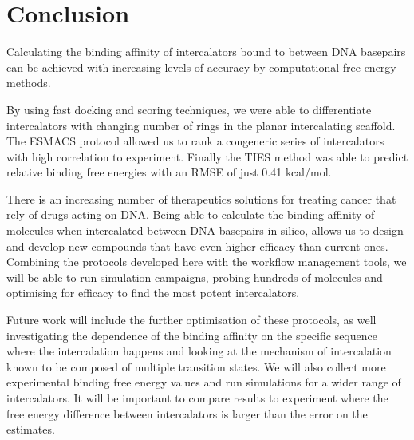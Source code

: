 \chapter{Conclusion}

Calculating the binding affinity of intercalators bound to between DNA basepairs can be achieved with increasing levels of accuracy by computational free energy methods. 

By using fast docking and scoring techniques, we were able to differentiate intercalators with changing number of rings in the planar intercalating scaffold. The ESMACS protocol allowed us to rank a congeneric series of intercalators with high correlation to experiment. Finally the TIES method was able to predict relative binding free energies with an RMSE of just 0.41 kcal/mol. 

There is an increasing number of therapeutics solutions for treating cancer that rely of drugs acting on DNA. Being able to calculate the binding affinity of molecules when intercalated between DNA basepairs in silico, allows us to design and develop new compounds that have even higher efficacy than current ones. Combining the protocols developed here with the workflow management tools, we will be able to run simulation campaigns, probing hundreds of molecules and optimising for efficacy to find the most potent intercalators.

Future work will include the further optimisation of these protocols, as well investigating the dependence of the binding affinity on the specific sequence where the intercalation happens and looking at the mechanism of intercalation known to be composed of multiple transition states. We will also collect more experimental binding free energy values and run simulations for a wider range of intercalators. It will be important to compare results to experiment where the free energy difference between intercalators is larger than the error on the estimates. 
